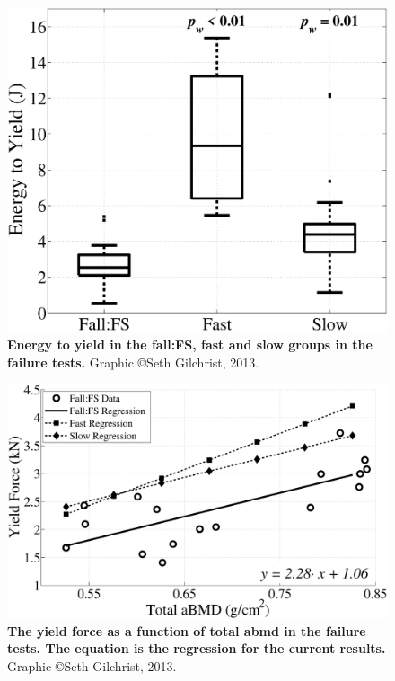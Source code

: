 \begin{figure}[h]
\centering
\includegraphics[width=\linewidth]{./appendixPlots/figures/EnergyAll}
\caption[Energy to yield in failure tests]{\textbf{Energy to yield in the fall:FS, fast and slow groups in the failure tests.} Graphic \copyright Seth Gilchrist, 2013.}
\label{fig:EnergyAll}
\end{figure}
\clearpage

\begin{figure}[h]
\centering
\includegraphics[width=\linewidth]{./appendixPlots/figures/MaxForceVsDXA}
\caption[Yield force vs.\ total \ac{abmd} in failure tests]{\textbf{The yield force as a function of total \ac{abmd} in the failure tests. The equation is the regression for the current results.} Graphic \copyright Seth Gilchrist, 2013.}
\label{fig:MaxForceVsDXA}
\end{figure}
\clearpage


